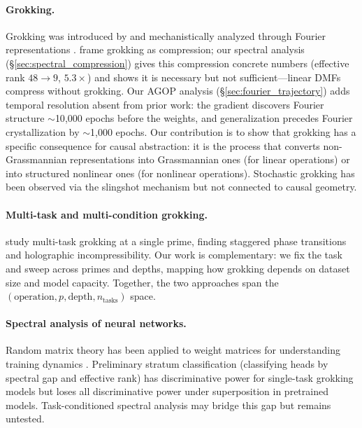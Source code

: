 \documentclass{article}
\begin{document}
\paragraph{Grokking.}
Grokking was introduced by \citet{power2022grokking} and mechanistically
analyzed through Fourier representations \citep{nanda2023progress,
zhong2024clock}. \citet{liu2023grokking} frame grokking as compression;
our spectral analysis (\S\ref{sec:spectral_compression}) gives this
compression concrete numbers (effective rank $48 \to 9$, $5.3\times$) and
shows it is necessary but not sufficient---linear DMFs compress without
grokking. Our AGOP analysis (\S\ref{sec:fourier_trajectory}) adds temporal
resolution absent from prior work: the gradient discovers Fourier structure
$\sim$10{,}000 epochs before the weights, and generalization precedes
Fourier crystallization by $\sim$1{,}000 epochs. Our contribution is to
show that grokking has a specific consequence for causal abstraction: it is
the process that converts non-Grassmannian representations into Grassmannian
ones (for linear operations) or into structured nonlinear ones (for nonlinear
operations). Stochastic grokking has been observed via the slingshot mechanism
\citep{thilak2022slingshot} but not connected to causal geometry.

\paragraph{Multi-task and multi-condition grokking.}
\citet{xu2026multitask} study multi-task grokking at a single prime, finding
staggered phase transitions and holographic incompressibility. Our work is
complementary: we fix the task and sweep across primes and depths, mapping how
grokking depends on dataset size and model capacity. Together, the two
approaches span the $(\text{operation}, p, \text{depth}, n_\text{tasks})$
space.

\paragraph{Spectral analysis of neural networks.}
Random matrix theory has been applied to weight matrices for understanding
training dynamics \citep{martin2021implicit}. Preliminary stratum
classification (classifying heads by spectral gap and effective rank) has
discriminative power for single-task grokking models but loses all
discriminative power under superposition in pretrained models.
Task-conditioned spectral analysis may bridge this gap but remains
untested.
\end{document}
